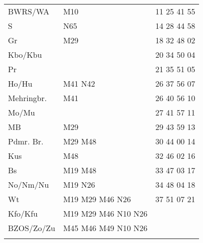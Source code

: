 \begin{tabular}{!{\color{schiefergrau}\vrule width 3pt}*{3}{l!{\color{schiefergrau}\vrule width 3pt}}}
\hline
{}
 \\
\hline
BWRS/WA    & \mtram{} M10                                                      & 11 25 41 55 \\
S          & \nbus{} N65                                                       & 14 28 44 58 \\
Gr         & \mbus{} M29                                                       & 18 32 48 02 \\
Kbo/Kbu    & \nuacht{}                                                         & 20 34 50 04 \\
Pr         &                                                                   & 21 35 51 05 \\
Ho/Hu      & \mbus{} M41 \nbus{} N42                                           & 26 37 56 07 \\
Mehringbr. & \nusechs{} \mbus{} M41                                            & 26 40 56 10 \\
Mo/Mu      &                                                                   & 27 41 57 11 \\
MB         & \mbus{} M29                                                       & 29 43 59 13 \\
Pdmr. Br.  & \nuzwei{} \mbus{} M29 M48                                         & 30 44 00 14 \\
Kus        & \nuzwei{} \mbus{} M48                                             & 32 46 02 16 \\
Bs         & \nuzwei{} \mbus{} M19 M48                                         & 33 47 03 17 \\
No/Nm/Nu   & \nuzwei{} \mbus{} M19 \nbus{} N26                                 & 34 48 04 18 \\
Wt         & \nuzwei{} \nudrei{} \mbus{} M19 M29 M46 \nbus{} N26               & 37 51 07 21 \\
Kfo/Kfu    & \nuzwei{} \nudrei{} \nuneun{} \mbus{} M19 M29 M46 \nbus{} N10 N26 & \\
BZOS/Zo/Zu & \nuzwei{} \nuneun{} \mbus{} M45 M46 M49 \nbus{} N10 N26           & \\
\myhline
\end{tabular}
%
